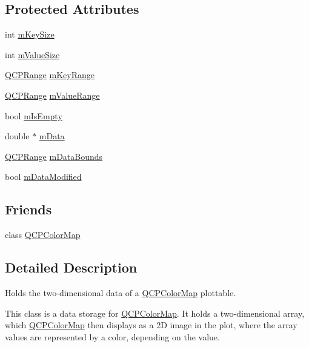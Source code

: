 \subsection*{Protected Attributes}
\begin{DoxyCompactItemize}
\item 
int \hyperlink{class_q_c_p_color_map_data_a354e06462023340fbc03894b22499f6d}{m\+Key\+Size}
\item 
int \hyperlink{class_q_c_p_color_map_data_ae8ee9093632a59f55eb4fc06579ed256}{m\+Value\+Size}
\item 
\hyperlink{class_q_c_p_range}{Q\+C\+P\+Range} \hyperlink{class_q_c_p_color_map_data_aaaafd0d7d0f153dbd152f3daf34254ee}{m\+Key\+Range}
\item 
\hyperlink{class_q_c_p_range}{Q\+C\+P\+Range} \hyperlink{class_q_c_p_color_map_data_a225bb96f10c1a27b51ae59249477dbef}{m\+Value\+Range}
\item 
bool \hyperlink{class_q_c_p_color_map_data_a10e91aa89ed05bd177b1f81e07b465b8}{m\+Is\+Empty}
\item 
double $\ast$ \hyperlink{class_q_c_p_color_map_data_ac1682862022f575191351c9825187d39}{m\+Data}
\item 
\hyperlink{class_q_c_p_range}{Q\+C\+P\+Range} \hyperlink{class_q_c_p_color_map_data_a1798b3dcc0a27091d196bfd156dcb3f2}{m\+Data\+Bounds}
\item 
bool \hyperlink{class_q_c_p_color_map_data_ad3cc682da2ac14e5acdbc05cf4d3d93b}{m\+Data\+Modified}
\end{DoxyCompactItemize}
\subsection*{Friends}
\begin{DoxyCompactItemize}
\item 
class \hyperlink{class_q_c_p_color_map_data_afa9d9eab63af3e6f20f882c8d7cc9f20}{Q\+C\+P\+Color\+Map}
\end{DoxyCompactItemize}


\subsection{Detailed Description}
Holds the two-\/dimensional data of a \hyperlink{class_q_c_p_color_map}{Q\+C\+P\+Color\+Map} plottable. 

This class is a data storage for \hyperlink{class_q_c_p_color_map}{Q\+C\+P\+Color\+Map}. It holds a two-\/dimensional array, which \hyperlink{class_q_c_p_color_map}{Q\+C\+P\+Color\+Map} then displays as a 2\+D image in the plot, where the array values are represented by a color, depending on the value.

